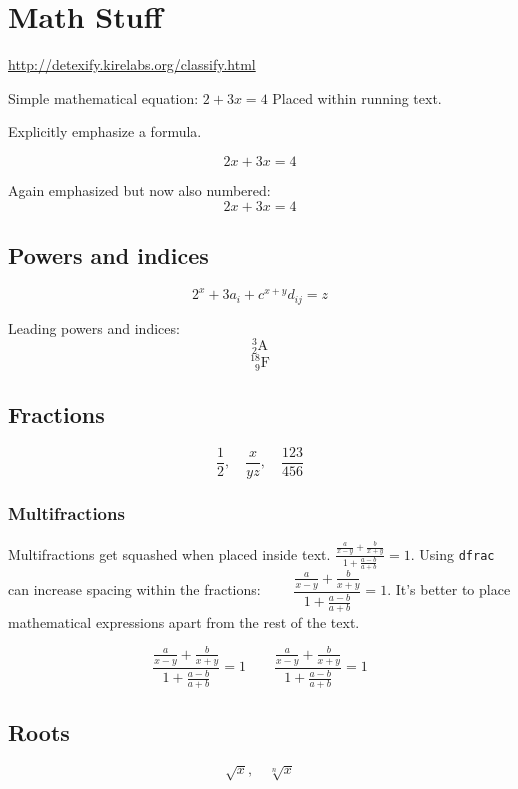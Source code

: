 \documentclass[10pt, a4paper]{article}
\numberwithin{equation}{section}
\numberwithin{figure}{section}
\begin{document}
\section{Math Stuff}

\url{http://detexify.kirelabs.org/classify.html}

Simple mathematical equation: \( 2 + 3x = 4\) Placed within running text.

Explicitly emphasize a formula.

\[ 2x + 3x = 4 \]

Again emphasized but now also numbered:
\begin{equation}
2x + 3x = 4
\end{equation}

\subsection{Powers and indices}

\[ 2^x + 3a_i + c^{x+y}d_{ij} = z  \]


Leading powers and indices:
\[ {}^3_2\mathrm{A} \]
\[ {}^{18}_{\phantom{1}9}\mathrm{F} \]


\subsection{Fractions}

\[\frac{1}{2}, \quad \frac{x}{yz},\quad \frac{123}{456}\]

\subsubsection{Multifractions}

Multifractions get squashed when placed inside text. \( \frac{\frac{a}{x-y}+\frac{b}{x+y}}{1+\frac{a-b}{a+b}} = 1. \) Using \texttt{dfrac} can increase spacing within the fractions: \( \qquad \dfrac{\frac{a}{x-y}+\frac{b}{x+y}}{1+\frac{a-b}{a+b}} = 1 \). It's better to place mathematical expressions apart from the rest of the text.

\[\frac{\frac{a}{x-y}+\frac{b}{x+y}}{1+\frac{a-b}{a+b}} = 1 \qquad \dfrac{\frac{a}{x-y}+\frac{b}{x+y}}{1+\frac{a-b}{a+b}} = 1 \]

\subsection{Roots}

\[ \sqrt{x},\quad \sqrt[n]{x}  \]
\end{document}
